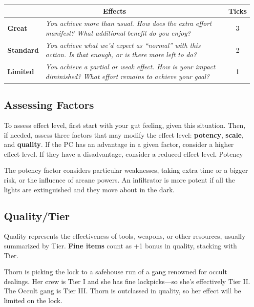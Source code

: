 \begin{center}\begin{tabular}{|l|m{8cm}|c|}
\hline
\multicolumn{2}{|c|}{\textbf{Effects}} & \textbf{Ticks} \\
\hline
\textbf{Great} & \emph{You achieve more than usual. How does the extra effort manifest? What additional benefit do you enjoy?} & 3 \\
\hline
\textbf{Standard} & \emph{You achieve what we’d expect as ``normal'' with this action. Is that enough, or is there more left to do?} & 2\\
\hline
\textbf{Limited} & \emph{You achieve a partial or weak effect. How is your impact diminished? What effort remains to achieve your goal?} & 1 \\
\hline
\end{tabular}\end{center}

\subsection{Assessing Factors}

To assess effect level, first start with your gut feeling, given this situation. Then, if needed, assess three factors that may modify the effect level: \textbf{potency}, \textbf{scale}, and \textbf{quality}. If the PC has an advantage in a given factor, consider a higher effect level. If they have a disadvantage, consider a reduced effect level.
Potency

The potency factor considers particular weaknesses, taking extra time or a bigger risk, or the influence of arcane powers. An infiltrator is more potent if all the lights are extinguished and they move about in the dark.

\subsection{Quality/Tier}

Quality represents the effectiveness of tools, weapons, or other resources, usually summarized by Tier. \textbf{Fine items} count as +1 bonus in quality, stacking with Tier.

\begin{qb}Thorn is picking the lock to a safehouse run of a gang renowned for occult dealings. Her crew is Tier I and she has fine lockpicks—so she’s effectively Tier II. The Occult gang is Tier III. Thorn is outclassed in quality, so her effect will be limited on the lock.\end{qb}

